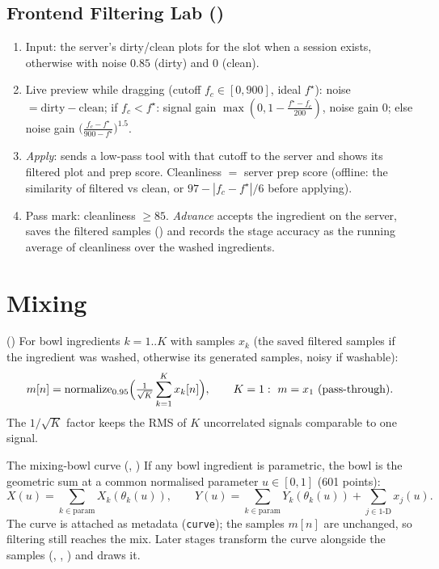 \documentclass[11pt,a4paper]{article}
\begin{document}
\subsection{Frontend Filtering Lab ()}
\begin{enumerate}
\item Input: the server's dirty/clean plots for the slot when a session exists, otherwise
   with noise $0.85$ (dirty) and $0$ (clean).
\item Live preview while dragging (cutoff $f_c\in[0,900]$, ideal $f^\star$):
  noise $=\text{dirty}-\text{clean}$;
  if $f_c<f^\star$: signal gain $\max(0,1-\tfrac{f^\star-f_c}{200})$, noise gain $0$;
  else noise gain $\bigl(\tfrac{f_c-f^\star}{900-f^\star}\bigr)^{1.5}$.
\item \emph{Apply}: sends a low-pass tool with that cutoff to the server and shows its
  filtered plot and prep score. Cleanliness $=$ server prep score (offline: the similarity of
  filtered vs clean, or $97-|f_c-f^\star|/6$ before applying).
\item Pass mark: cleanliness $\ge 85$. \emph{Advance} accepts the ingredient on the server,
  saves the filtered samples () and records the stage accuracy
  as the running average of cleanliness over the washed ingredients.
\end{enumerate}

\section{Mixing}
\begin{mathbox}{ ()}
For bowl ingredients $k=1..K$ with samples $x_k$ (the saved filtered samples if the
ingredient was washed, otherwise its generated samples, noisy if washable):
\[
m[n]=\text{normalize}_{0.95}\Bigl(\tfrac{1}{\sqrt K}\sum_{k=1}^{K}x_k[n]\Bigr),\qquad
K=1:\ m=x_1\ \text{(pass-through)} .
\]
The $1/\sqrt K$ factor keeps the RMS of $K$ uncorrelated signals comparable to one signal.
\end{mathbox}

\begin{mathbox}{The mixing-bowl curve (, )}
If any bowl ingredient is parametric, the bowl is the geometric sum at a common
normalised parameter $u\in[0,1]$ (601 points):
\[
X(u)=\sum_{k\in\text{param}}X_k(\theta_k(u)),\qquad
Y(u)=\sum_{k\in\text{param}}Y_k(\theta_k(u))+\sum_{j\in\text{1-D}}x_j(u).
\]
The curve is attached as metadata (\texttt{curve}); the samples $m[n]$ are unchanged, so
filtering still reaches the mix. Later stages transform the curve alongside the samples
(, , ) and  draws it.
\end{mathbox}
\end{document}
